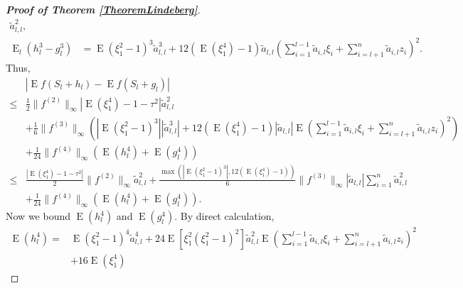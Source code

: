 \documentclass[11pt]{article}
\DeclareMathOperator{\myE}{E}
\theoremstyle{plain}
\theoremstyle{definition}
\theoremstyle{remark}
\begin{document}
\begin{proof}[\textbf{Proof of Theorem \ref{TheoremLindeberg}}]
\begin{equation*}
\begin{split}
        \tilde a_{l,l}^2
        ,
        \\
        \myE_l (h_l^3-g_l^3)&= 
        \myE (\xi_1^2-1)^3
        \tilde a_{l,l}^3 
        +
        12 (\myE (\xi_1^4) - 1) \tilde a_{l,l} \left( \sum_{i=1}^{l-1} \tilde a_{i,l} \xi_i + \sum_{i=l+1}^n \tilde a_{i,l} z_i    \right)^2 
        .
    \end{split}
\end{equation*}
Thus,
\begin{equation}\label{eq:Lin1}
        \begin{split}
             &\left| \myE f(S_{l}+h_{l})-\myE f(S_{l}+g_{l})\right|
             \\
\leq&
\frac{1}{2}
\|f^{(2)}\|_\infty
\left|
\myE(\xi_1^4)-1
            -\tau^2
\right|
        \tilde a_{l,l}^2
        \\
            &+
            \frac{1}{6} \|f^{(3)}\|_{\infty}
\left(
    \left|\myE (\xi_1^2-1)^3\right|
        |\tilde a_{l,l}^3 |
        +
        12 (\myE (\xi_1^4)-1) |\tilde a_{l,l}|
            \myE 
            \left( \sum_{i=1}^{l-1} \tilde a_{i,l} \xi_i + \sum_{i=l+1}^n \tilde a_{i,l} z_i    \right)^2 
    \right)
    \\
            &+
            \frac{1}{24} \|f^{(4)} \|_{\infty} \left(\myE (h_{l}^4)+\myE (g_{l}^4)\right)
            \\
\leq &
\frac{
\left|
\myE (\xi_1^4)-1
            -
            \tau^2
\right|
}{2}
\|f^{(2)}\|_\infty
        \tilde a_{l,l}^2
            +
            \frac{
            \max\left(
    \left|\myE (\xi_1^2-1)^3\right|
            ,
12 (\myE (\xi_1^4)-1)
        \right)
            }{6} \|f^{(3)}\|_\infty
|\tilde a_{l,l}|
         \sum_{i=1}^{n} \tilde a_{i,l}^2 
         \\
            &+
            \frac{1}{24} \|f^{(4)} \|_{\infty} \left(\myE (h_{l}^4)+\myE (g_{l}^4)\right)
            .
        \end{split}
    \end{equation}
    Now we bound $\myE (h_l^4)$ and $\myE (g_l^4)$.
    By direct calculation,
\begin{equation*}
    \begin{split}
        \myE (h_l^4)
        =&
        \myE (\xi_1^2 - 1)^4 \tilde a_{l,l}^4
        + 24 \myE [ \xi_1^2(\xi_1^2 -1)^2]
        \tilde a_{l,l}^2
        \myE \left( 
        \sum_{i=1}^{l-1} \tilde a_{i,l} \xi_i 
        +\sum_{i =l +1}^n \tilde a_{i,l} z_i 
        \right)^2
        \\
        &+
        16 \myE (\xi_1^4 )

\end{split}
\end{equation*}
\end{proof}
\end{document}
